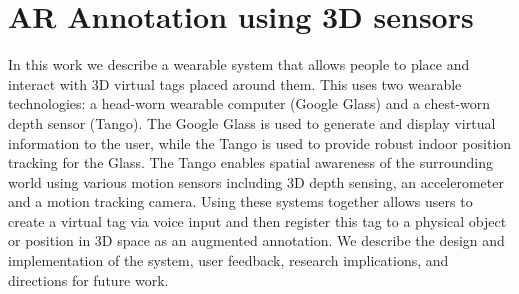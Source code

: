 
\section{AR Annotation using 3D sensors}
\label{sec:3D}







In this work we describe a wearable system that allows people to place and interact with 3D virtual tags placed around them. This uses two wearable technologies: a head-worn wearable computer (Google Glass) and a chest-worn depth sensor (Tango). The Google Glass is used to generate and display virtual information to the user, while the Tango is used to provide robust indoor position tracking for the Glass. The Tango enables spatial awareness of the surrounding world using various motion sensors including 3D depth sensing, an accelerometer and a motion tracking camera. Using these systems together allows users to create a virtual tag via voice input and then register this tag to a physical object or position in 3D space as an augmented annotation. We describe the design and implementation of the system, user feedback,  research implications, and directions for future work.  




